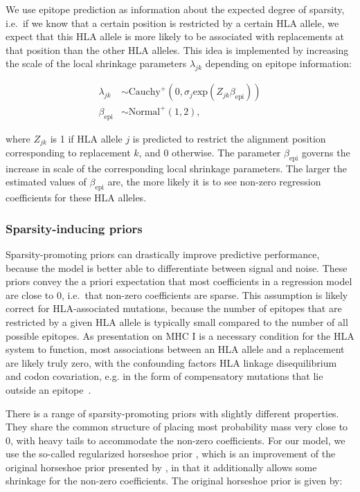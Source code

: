 \documentclass{bioinfo}
\begin{document}
\begin{methods}
We use epitope prediction as information about the expected degree of sparsity, i.e.\ if we know that a certain position is restricted by a certain HLA allele, we expect that this HLA allele is more likely to be associated with replacements at that position than the other HLA alleles. This idea is implemented by increasing the scale of the local shrinkage parameters \(\lambda_{jk}\) depending on epitope information:

\begin{equation}
  \begin{aligned}
    \lambda_{jk} &\sim \text{Cauchy}^{+}(0, \sigma_{j}\text{exp}(Z_{jk}\beta_{\text{epi}})) \\
    \beta_{\text{epi}} &\sim \text{Normal}^{+}(1, 2),
  \end{aligned}
\end{equation}
 
where \(Z_{jk}\) is 1 if HLA allele \(j\) is predicted to restrict the alignment position corresponding to replacement \(k\), and 0 otherwise. The parameter \(\beta_{\text{epi}}\) governs the increase in scale of the  corresponding local shrinkage parameters. The larger the estimated values of \(\beta_{\text{epi}}\) are, the more likely it is to see non-zero regression coefficients for these HLA alleles.

\subsubsection{Sparsity-inducing priors}
  
Sparsity-promoting priors \citep{Piironen2017} can drastically improve predictive performance, because the model is better able to differentiate between signal and noise. These priors convey the a priori expectation that most coefficients in a regression model are close to 0, i.e.\ that non-zero coefficients are sparse. This assumption is likely correct for HLA-associated mutations, because the number of epitopes that are restricted by a given HLA allele is typically small compared to the number of all possible epitopes. As presentation on MHC I is a necessary condition for the HLA system to function, most associations between an HLA allele and a replacement are likely truly zero, with the confounding factors HLA linkage disequilibrium and codon covariation, e.g. in the form of compensatory mutations that lie outside an epitope~\citep{Ruhl2011}.

There is a range of sparsity-promoting priors with slightly different properties. They share the common structure of placing most probability mass very close to 0, with heavy tails to accommodate the non-zero coefficients.
For our model, we use the so-called regularized horseshoe prior \citep{Piironen2017}, which is an improvement of the original horseshoe prior presented by \citet{Carvalho2010}, in that it additionally allows some shrinkage for the non-zero coefficients. The original horseshoe prior is given by:


\end{methods}
\end{document}
